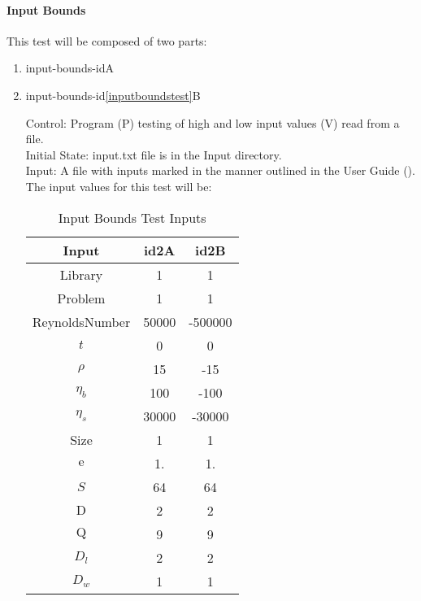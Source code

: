 \documentclass[12pt, titlepage]{article}
\newcounter{testcounter} %
\begin{document}
\paragraph{Input Bounds}
This test will be composed of two parts:
\begin{enumerate}
						
\item{input-bounds-id\thetestcounter A \label{inputboundstest}}
\item{input-bounds-id\ref{inputboundstest}B\\}

Control: Program (P) testing of high and low input values (V) read from a file.\\
					
Initial State: input.txt file is in the Input directory.\\
					
Input: A file with inputs marked in the manner outlined in the
User Guide (\citet{LBM_UserGuide_PM}).\\The input values for this test will
be:\\

\begin{table}[!h]
	\begin{center}
		\begin{tabular}{| c | c | c |}
			\hline
			Input & id2A & id2B \\
			\hline
			  Library & 1 & 1\\
			  \hline
			Problem & 1 & 1\\
			\hline
			ReynoldsNumber & 50000 & -500000 \\
			\hline
			$t$ & 0& 0\\
			\hline
			$\rho$ & 15& -15\\
			\hline
			$\eta_b$ & 100& -100\\
			\hline
			$\eta_s$ & 30000& -30000\\
			\hline
			Size & 1& 1\\
			\hline
			$\mathrm{e}$ & 1.& 1.\\
			\hline
			$S$ & 64& 64\\
			\hline
			$\mathrm{D}$ & 2& 2\\
			\hline
			$\mathrm{Q}$ & 9& 9\\
			\hline
			$D_{l}$ & 2& 2\\
			\hline
			$D_{w}$ & 1& 1\\
			\hline
		\end{tabular}
		\caption{Input Bounds Test Inputs}
	\end{center}
\end{table}
	

\end{enumerate}
\end{document}
